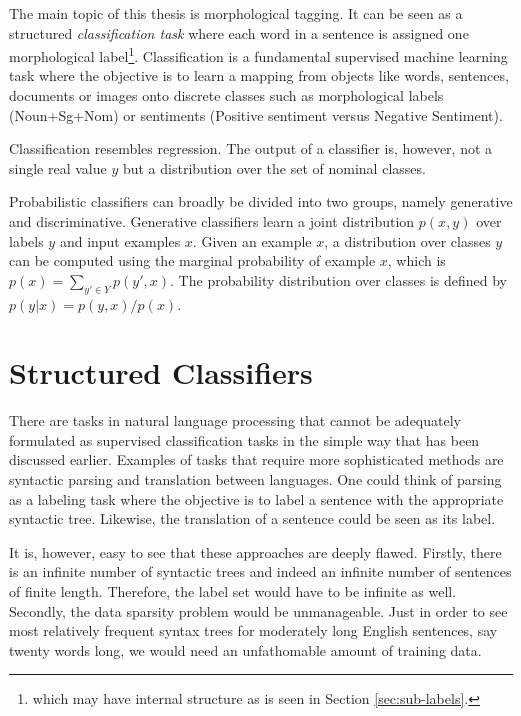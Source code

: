 The main topic of this thesis is morphological tagging. It can be seen
as a structured {\it classification task} where each word in a
sentence is assigned one morphological label\footnote{which may have
  internal structure as is seen in Section
  \ref{sec:sub-labels}.}. Classification is a fundamental supervised
machine learning task where the objective is to learn a mapping from
objects like words, sentences, documents or images onto discrete
classes such as morphological labels (Noun+Sg+Nom) or sentiments
(Positive sentiment versus Negative Sentiment).

Classification resembles regression. The output of a classifier is, however, not
a single real value $y$ but a distribution over the set of nominal
classes.

Probabilistic classifiers can broadly be divided into two groups,
namely generative and discriminative. Generative classifiers learn a
joint distribution $p(x,y)$ over labels $y$ and input examples
$x$. Given an example $x$, a distribution over classes $y$ can be
computed using the marginal probability of example $x$, which is $p(x)
= \sum_{y' \in Y} p(y',x)$. The probability distribution over classes
is defined by $p(y|x) = p(y,x) / p(x)$.

\section{Structured Classifiers}

There are tasks in natural language processing that cannot be
adequately formulated as supervised classification tasks in the simple
way that has been discussed earlier. Examples of tasks that require
more sophisticated methods are syntactic parsing and translation
between languages. One could think of parsing as a labeling task where
the objective is to label a sentence with the appropriate syntactic
tree. Likewise, the translation of a sentence could be seen as its
label. 

It is, however, easy to see that these approaches are deeply
flawed. Firstly, there is an infinite number of syntactic trees and
indeed an infinite number of sentences of finite length. Therefore,
the label set would have to be infinite as well. Secondly, the data
sparsity problem would be unmanageable. Just in order to see most
relatively frequent syntax trees for moderately long English
sentences, say twenty words long, we would need an unfathomable amount
of training data.

